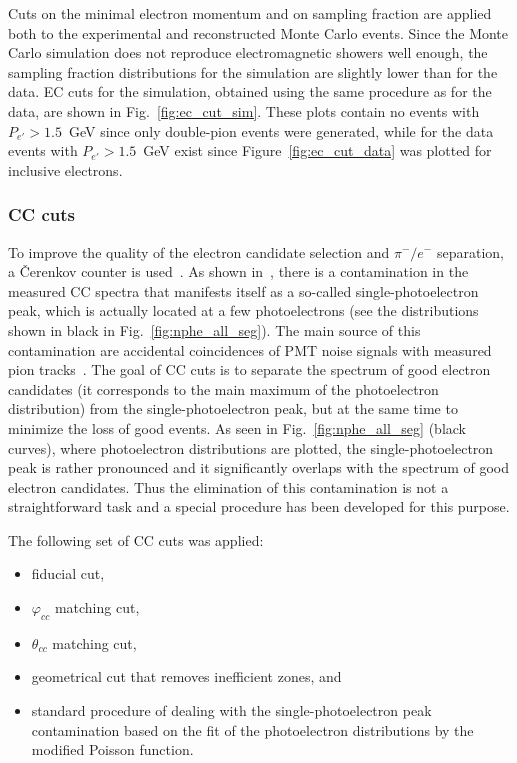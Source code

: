 Cuts on the minimal electron momentum and on sampling fraction are applied both to the experimental and reconstructed Monte Carlo events. Since the Monte Carlo simulation does not reproduce electromagnetic showers well enough, the sampling fraction distributions for the simulation are slightly lower than for the data. EC cuts for the simulation, obtained using the same  procedure as for the data, are shown in Fig.~\ref{fig:ec_cut_sim}. These plots contain no events with $P_{e'} > 1.5$~GeV since only double-pion events were generated, while for the data events with $P_{e'} > 1.5$~GeV exist since Figure~\ref{fig:ec_cut_data} was plotted for inclusive electrons.



\subsubsection{CC cuts}
\label{Sect:cc_cuts} 
To improve the quality of the electron candidate selection and $\pi^{-}/e^{-}$ separation, a \v Cerenkov counter is used~\cite{Adams:2001kk}. As shown in~\cite{Osipenko:2004}, there is a contamination in the measured CC spectra that manifests itself as a so-called single-photoelectron peak, which is actually located at a few photoelectrons (see the distributions shown in black in Fig.~\ref{fig:nphe_all_seg}). The main source of this contamination are accidental coincidences of PMT noise signals with measured pion tracks~\cite{Osipenko:2004}. The goal of CC cuts is to separate the spectrum of good electron candidates (it corresponds to the main maximum of the photoelectron distribution) from the single-photoelectron peak, but at the same time to minimize the loss of good events. As seen in Fig.~\ref{fig:nphe_all_seg} (black curves), where photoelectron distributions are plotted, the single-photoelectron peak is rather pronounced and it significantly overlaps with the spectrum of good electron candidates. Thus the elimination of this contamination is not a straightforward task and a special procedure has been developed for this purpose. 

The following set of CC cuts was applied:\vspace{-0.5em}

\begin{itemize}
\item fiducial cut,\vspace{-0.5em}
\item $\varphi_{cc}$ matching cut,\vspace{-0.5em}
\item $\theta_{cc}$ matching cut,\vspace{-0.5em}
\item geometrical cut that removes inefficient zones, and\vspace{-0.5em}
\item standard procedure of dealing with the single-photoelectron peak contamination based on the fit of the photoelectron distributions by the modified Poisson function.
\end{itemize}

